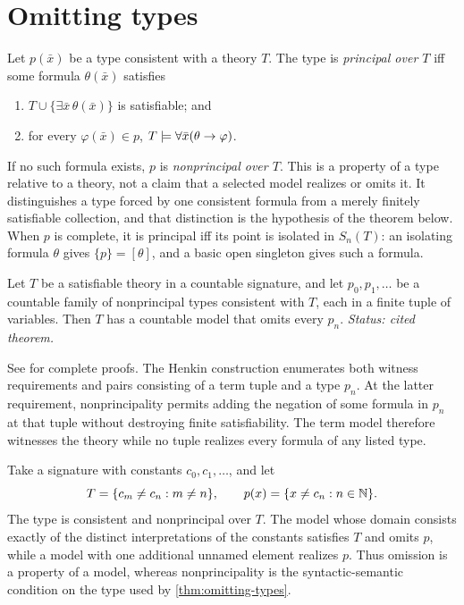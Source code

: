 \section{Omitting types}
\label{sec:types-ultraproducts-03}
\label{sec:omitting-types}

\begin{definition}
\label{def:principal-type}
Let \(p(\bar x)\) be a type consistent with a theory \(T\).  The type is
\emph{principal over \(T\)} iff some formula \(\theta(\bar x)\) satisfies
\begin{enumerate}
  \item \(T\cup\{\exists\bar x\,\theta(\bar x)\}\) is satisfiable; and
  \item for every \(\varphi(\bar x)\in p\),
        \(T\models\forall\bar x(\theta\to\varphi)\).
\end{enumerate}
If no such formula exists, \(p\) is \emph{nonprincipal over \(T\)}.  This is
a property of a type relative to a theory, not a claim that a selected model
realizes or omits it.  It distinguishes a type forced by one consistent
formula from a merely finitely satisfiable collection, and that distinction is
the hypothesis of the theorem below.  When \(p\) is complete, it is principal
iff its point is isolated in \(S_n(T)\): an isolating formula
\(\theta\) gives \(\{p\}=[\theta]\), and a basic open singleton gives such a
formula.
\end{definition}

\begin{theorem}
\label{thm:omitting-types}
Let \(T\) be a satisfiable theory in a countable signature, and let
\(p_0,p_1,\ldots\) be a countable family of nonprincipal types consistent
with \(T\), each in a finite tuple of variables.  Then \(T\) has a countable
model that omits every \(p_n\).
\textit{Status: cited theorem.}
\end{theorem}

See \cite{Hodges1993,Marker2002} for complete proofs.  The Henkin construction
enumerates both witness requirements and pairs consisting of a term tuple and
a type \(p_n\).  At the latter requirement, nonprincipality permits adding the
negation of some formula in \(p_n\) at that tuple without destroying finite
satisfiability.  The term model therefore witnesses the theory while no tuple
realizes every formula of any listed type.

\begin{example}
Take a signature with constants \(c_0,c_1,\ldots\), and let
\[
  T=\{c_m\ne c_n:m\ne n\},
  \qquad
  p(x)=\{x\ne c_n:n\in\mathbb{N}\}.
\]
The type is consistent and nonprincipal over \(T\).  The model whose domain
consists exactly of the distinct interpretations of the constants satisfies
\(T\) and omits \(p\), while a model with one additional unnamed element
realizes \(p\).  Thus omission is a property of a model, whereas
nonprincipality is the syntactic-semantic condition on the type used by
\cref{thm:omitting-types}.
\end{example}

